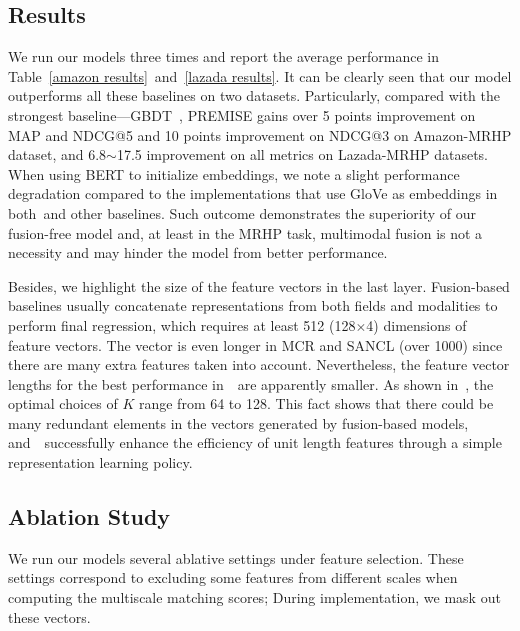 \subsection{Results}
We run our models three times and report the average performance in Table~\ref{amazon results}~and~\ref{lazada results}.
It can be clearly seen that our model outperforms all these baselines on two datasets.
Particularly, compared with the strongest baseline---GBDT~\cite{nguyen2023gradient}, PREMISE gains over 5 points improvement on MAP and NDCG@5 and 10 points improvement on NDCG@3 on Amazon-MRHP dataset, and 6.8$\sim$17.5 improvement on all metrics on Lazada-MRHP datasets.
When using BERT to initialize embeddings, we note a slight performance degradation compared to the implementations that use GloVe as embeddings in both~\modelname and other baselines. 
Such outcome demonstrates the superiority of our fusion-free model and, at least in the MRHP task, multimodal fusion is not a necessity and may hinder the model from better performance.

Besides, we highlight the size of the feature vectors in the last layer.
Fusion-based baselines usually concatenate representations from both fields and modalities to perform final regression, which requires at least 512 (128$\times$4) dimensions of feature vectors.
The vector is even longer in MCR and SANCL (over 1000) since there are many extra features taken into account.
Nevertheless, the feature vector lengths for the best performance in~\modelname~are apparently smaller.
As shown in~, the optimal choices of $K$ range from 64 to 128.
This fact shows that there could be many redundant elements in the vectors generated by fusion-based models, and~\modelname~successfully enhance the efficiency of unit length features through a simple representation learning policy.



\subsection{Ablation Study}
We run our models several ablative settings under feature selection.
These settings correspond to excluding some features from different scales when computing the multiscale matching scores;
During implementation, we mask out these vectors. 


